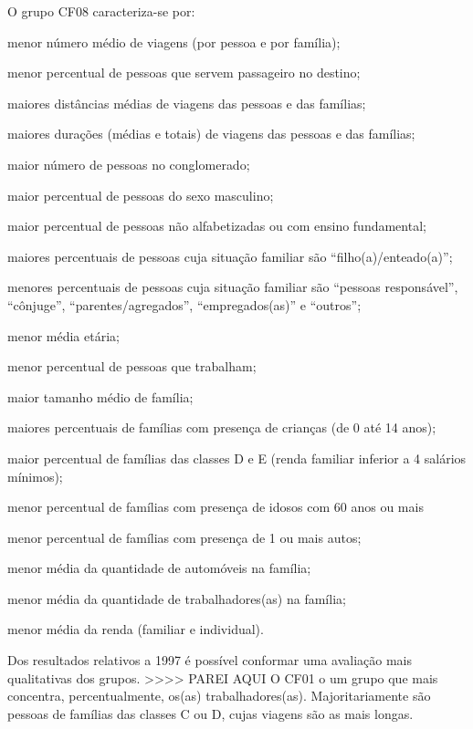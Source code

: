 O grupo CF08 caracteriza-se por:
\begin{compactitem}
\item menor número médio de viagens (por pessoa e por família);
\item menor percentual de pessoas que servem passageiro no destino;
\item maiores distâncias médias de viagens das pessoas e das famílias;
\item maiores durações (médias e totais) de viagens das pessoas e das famílias;

\item maior número de pessoas no conglomerado;
\item maior percentual de pessoas do sexo masculino;
\item maior percentual de pessoas não alfabetizadas ou com ensino fundamental;
\item maiores percentuais de pessoas cuja situação familiar são ``filho(a)/enteado(a)'';
\item menores percentuais de pessoas cuja situação familiar são ``pessoas responsável'', ``cônjuge'', ``parentes/agregados'', ``empregados(as)'' e ``outros'';
\item menor média etária;
\item menor percentual de pessoas que trabalham;

\item maior tamanho médio de família;
\item maiores percentuais de famílias com presença de crianças (de 0 até 14 anos);
\item maior percentual de famílias das classes D e E (renda familiar inferior a 4 salários mínimos);
\item menor percentual de famílias com presença de idosos com 60 anos ou mais
\item menor percentual de famílias com presença de 1 ou mais autos;
\item menor média da quantidade de automóveis na família;
\item menor média da quantidade de trabalhadores(as) na família;
\item menor média da renda (familiar e individual).
\end{compactitem}

Dos resultados relativos a 1997 é possível conformar uma avaliação mais qualitativas dos grupos.
>>>> PAREI AQUI
O CF01 o um grupo que mais concentra, percentualmente, os(as) trabalhadores(as). 
Majoritariamente são pessoas de famílias das classes C ou D, cujas viagens são as mais longas.

